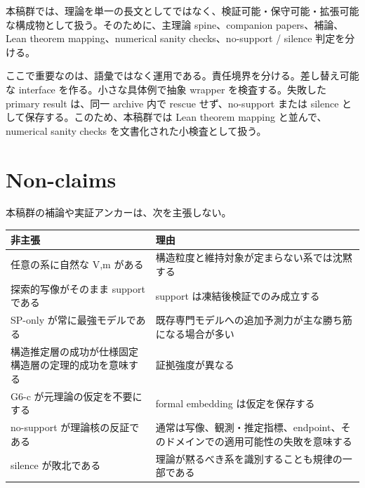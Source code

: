 \documentclass[12pt,a4paper]{article}
\begin{document}
本稿群では、理論を単一の長文としてではなく、検証可能・保守可能・拡張可能な構成物として扱う。そのために、主理論 spine、companion papers、補論、Lean theorem mapping、numerical sanity checks、no-support / silence 判定を分ける。

ここで重要なのは、語彙ではなく運用である。責任境界を分ける。差し替え可能な interface を作る。小さな具体例で抽象 wrapper を検査する。失敗した primary result は、同一 archive 内で rescue せず、no-support または silence として保存する。このため、本稿群では Lean theorem mapping と並んで、numerical sanity checks を文書化された小検査として扱う。

\section{Non-claims}\label{non-claims}

本稿群の補論や実証アンカーは、次を主張しない。

{\def\LTcaptype{table} %
\begin{longtable}[]{@{}
  >{\raggedright\arraybackslash}p{}
  >{\raggedright\arraybackslash}p{}@{}}
\toprule\noalign{}
\begin{minipage}[b]{\linewidth}\raggedright
非主張
\end{minipage} & \begin{minipage}[b]{\linewidth}\raggedright
理由
\end{minipage} \\
\midrule\noalign{}
\endhead
\bottomrule\noalign{}
\endlastfoot
任意の系に自然な V,m がある & 構造粒度と維持対象が定まらない系では沈黙する \\
探索的写像がそのまま support である & support は凍結後検証でのみ成立する \\
SP-only が常に最強モデルである & 既存専門モデルへの追加予測力が主な勝ち筋になる場合が多い \\
構造推定層の成功が仕様固定構造層の定理的成功を意味する & 証拠強度が異なる \\
G6-c が元理論の仮定を不要にする & formal embedding は仮定を保存する \\
no-support が理論核の反証である & 通常は写像、観測・推定指標、endpoint、そのドメインでの適用可能性の失敗を意味する \\
silence が敗北である & 理論が黙るべき系を識別することも規律の一部である \\
\end{longtable}
}
\end{document}
